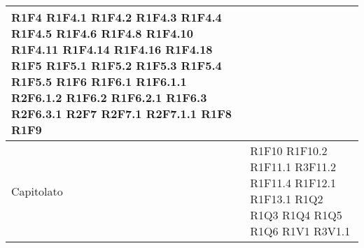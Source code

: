 \begin{center}
\begin{longtable}{|p{44mm}|p{22mm}|}
	R1F4  \newline
	R1F4.1\newline
	R1F4.2\newline
	R1F4.3\newline
	R1F4.4\newline
	R1F4.5\newline
	R1F4.6\newline
	R1F4.8\newline
	R1F4.10\newline
	R1F4.11\newline
	R1F4.14\newline
	R1F4.16\newline
	R1F4.18\newline
	R1F5\newline
	R1F5.1\newline
	R1F5.2\newline
	R1F5.3\newline
	R1F5.4\newline
	R1F5.5\newline
	R1F6\newline
	R1F6.1\newline
	R1F6.1.1\newline
	R2F6.1.2\newline
	R1F6.2\newline
	R1F6.2.1\newline
	R1F6.3\newline
	R2F6.3.1\newline
	R2F7\newline
	R2F7.1\newline
	R2F7.1.1\newline
	R1F8  \newline
	R1F9
	\\
	\hline
	Capitolato &
	R1F10  \newline
	R1F10.2\newline
	R1F11.1\newline
	R3F11.2\newline
	R1F11.4\newline
	R1F12.1\newline
	R1F13.1	\newline
	R1Q2  \newline
	R1Q3  \newline
	R1Q4   \newline	
	R1Q5  \newline
	R1Q6  \newline
	R1V1 \newline
	R3V1.1\newline

\end{longtable}
\end{center}
